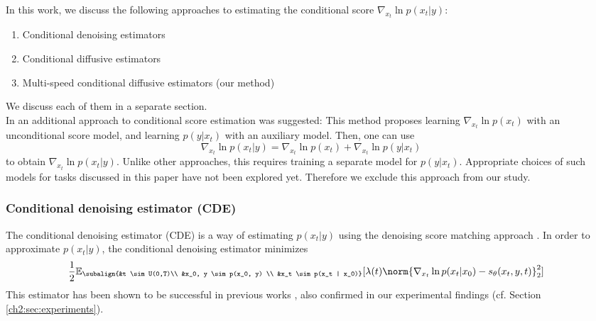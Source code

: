 In this work, we discuss the following approaches to estimating the conditional score $\nabla_{x_t} \ln p(x_t|y)$:
\begin{enumerate}
    \item Conditional denoising estimators
    \item Conditional diffusive estimators
    \item Multi-speed conditional diffusive estimators (our method)
\end{enumerate}
We discuss each of them in a separate section.\\

In \cite{song2021sde} an additional approach to conditional score estimation was suggested:
This method proposes learning $\nabla_{x_t} \ln p(x_t)$ with an unconditional score model, and  learning $p(y | x_t)$ with an auxiliary model. Then, one can use 
    \begin{equation*}
        \nabla_{x_t}\ln p(x_t |y) = \nabla_{x_t} \ln p(x_t) + \nabla_{x_t} \ln p(y | x_t)
    \end{equation*}
to obtain $\nabla_{x_t} \ln p(x_t | y)$. Unlike other approaches, this requires training a separate model for $p(y|x_t)$. Appropriate choices of such models for tasks discussed in this paper have not been explored yet. Therefore we exclude this approach from our study. 

\subsubsection{Conditional denoising estimator (CDE)}
The conditional denoising estimator (CDE) is a way of estimating $p(x_t|y)$ using the denoising score matching approach \cite{vincent2011connection, song2020generative_score}. In order to approximate $p(x_t|y)$, the conditional denoising estimator minimizes
\begin{gather}
\begin{aligned}
        \label{ch2:CDN}
        &\frac{1}{2} \mathbb{E}_{\subalign{&t \sim U(0,T)\\ &x_0, y \sim p(x_0, y) \\ &x_t \sim p(x_t | x_0)}} 
        [\lambda(t) \norm{\nabla_{x_t} \ln{p(x_t | x_0)} - s_\theta(x_t, y, t)}_2^2]
\end{aligned}
\end{gather}
This estimator has been shown to be successful in previous works \cite{saharia2021sr3,tashiro2021csdi}, also confirmed in our experimental findings (cf. Section \ref{ch2:sec:experiments}). 

